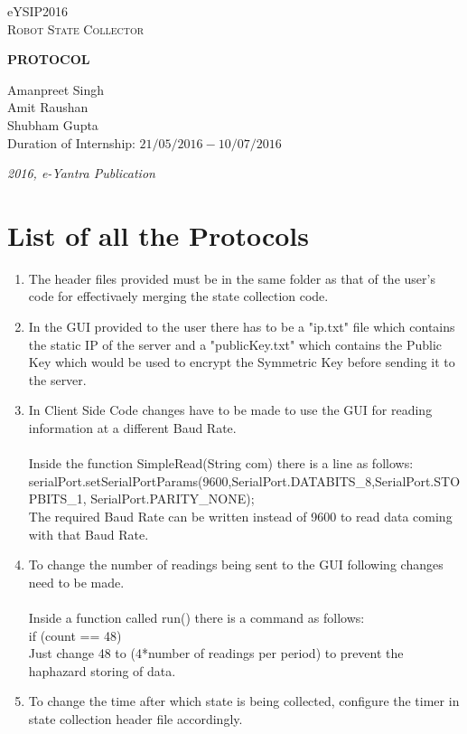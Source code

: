 \documentclass[a4paper,12pt,oneside]{book}
\begin{document}
\begin{titlepage}
\raggedright
{\Large eYSIP2016\\[1cm]}
{\Huge\scshape Robot State Collector \\[.1in]}
\vspace*{\fill}
\begingroup
\centering

\Large \textbf{PROTOCOL}

\endgroup
\vspace*{\fill}
\begin{flushright}
{\large Amanpreet Singh \\}
{\large Amit Raushan \\}
{\large Shubham Gupta \\}
{\large Duration of Internship: $ 21/05/2016-10/07/2016 $ \\}
\end{flushright}

{\itshape 2016, e-Yantra Publication}
\end{titlepage}

\chapter[Project Tag]{List of all the Protocols}

\begin{enumerate}
    \item The header files provided must be in the same folder as that of the user's code for effectivaely merging the state collection code.
    \item In the GUI provided to the user there has to be a "ip.txt" file which contains the static IP of the server and a "publicKey.txt" which contains the Public Key which would be used to encrypt the Symmetric Key before sending it to the server.  
    \item In Client Side Code changes have to be made to use the GUI for reading information at a different Baud Rate. \\ \\ 
    Inside the function SimpleRead(String com) there is a line as follows:\\
    serialPort.setSerialPortParams(9600,SerialPort.DATABITS\_8,SerialPort.STOPBITS\_1, SerialPort.PARITY\_NONE);\\
    The required Baud Rate can be written instead of 9600 to read data coming with that Baud Rate.
    \item To change the number of readings being sent to the GUI following changes need to be made. \\ \\
    Inside a function called run() there is a command as follows:\\
    if (count == 48) \\ 
    Just change 48 to (4*number of readings per period) to prevent the haphazard storing of data.
    \item To change the time after which state is being collected, configure the timer in state collection header file accordingly.
\end{enumerate}
\end{document}
